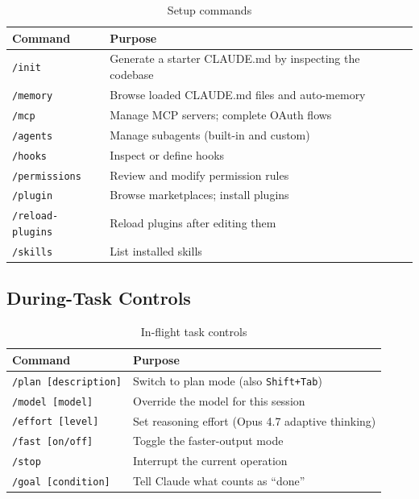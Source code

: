\begin{table}[ht]
\centering
\caption{Setup commands}
\label{tab:cmd-setup}
\begin{tabularx}{\textwidth}{lX}
\toprule
\textbf{Command} & \textbf{Purpose} \\
\midrule
\texttt{/init}              & Generate a starter CLAUDE.md by inspecting the codebase \\
\texttt{/memory}            & Browse loaded CLAUDE.md files and auto-memory \\
\texttt{/mcp}               & Manage MCP servers; complete OAuth flows \\
\texttt{/agents}            & Manage subagents (built-in and custom) \\
\texttt{/hooks}             & Inspect or define hooks \\
\texttt{/permissions}       & Review and modify permission rules \\
\texttt{/plugin}            & Browse marketplaces; install plugins \\
\texttt{/reload-plugins}    & Reload plugins after editing them \\
\texttt{/skills}            & List installed skills \\
\bottomrule
\end{tabularx}
\end{table}

\subsection{During-Task Controls}

\begin{table}[ht]
\centering
\caption{In-flight task controls}
\label{tab:cmd-task}
\begin{tabularx}{\textwidth}{lX}
\toprule
\textbf{Command} & \textbf{Purpose} \\
\midrule
\texttt{/plan [description]} & Switch to plan mode (also \texttt{Shift+Tab}) \\
\texttt{/model [model]}      & Override the model for this session \\
\texttt{/effort [level]}     & Set reasoning effort (Opus 4.7 adaptive thinking) \\
\texttt{/fast [on/off]}      & Toggle the faster-output mode \\
\texttt{/stop}               & Interrupt the current operation \\
\texttt{/goal [condition]}   & Tell Claude what counts as ``done'' \\
\bottomrule
\end{tabularx}
\end{table}


